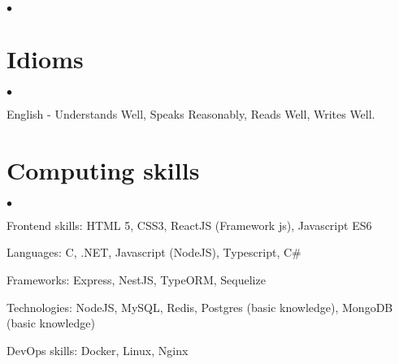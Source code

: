 \documentclass[margin,line]{res}
\newenvironment{list2}{
 \begin{list}{$\bullet$}{%
     \setlength{\itemsep}{0in}
     \setlength{\parsep}{0in} \setlength{\parskip}{0in}
     \setlength{\topsep}{0in} \setlength{\partopsep}{0in}
     \setlength{\leftmargin}{0.2in}}}{\end{list}}
\begin{document}
\begin{resume}
\begin{list2}
\end{list2}
\vspace{0.2cm}
\section{Idioms}
\begin{list2}
\item English - Understands Well, Speaks Reasonably, Reads Well, Writes Well.
\end{list2}
\vspace{0.2cm}
\section{Computing skills}
\begin{list2}
\item Frontend skills: HTML 5, CSS3, ReactJS (Framework js), Javascript ES6

\item Languages: C, .NET, Javascript (NodeJS), Typescript, C\#

\item Frameworks: Express, NestJS, TypeORM, Sequelize

\item Technologies: NodeJS, MySQL, Redis, Postgres (basic knowledge), MongoDB (basic knowledge)

\item DevOps skills: Docker, Linux, Nginx
\end{list2}
\end{resume}
\end{document}
